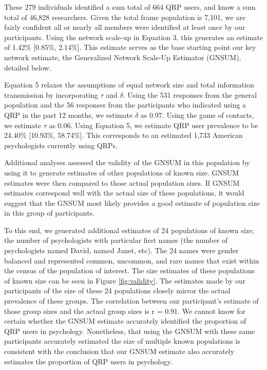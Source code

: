 \documentclass[jou]{apa6}
\theoremstyle{definition}
\theoremstyle{definition}
\theoremstyle{definition}
\theoremstyle{remark}
\begin{document}
These 279 individuals identified a sum total of 664 QRP users, and know
a sum total of 46,828 researchers. Given the total frame population is
7,101, we are fairly confident all or nearly all members were identified
at least once by our participants. Using the network scale-up in
Equation 3, this generates an estimate of 1.42\% {[}0.85\%, 2.14\%{]}.
This estimate serves as the base starting point our key network
estimate, the Generalized Network Scale-Up Estimator (GNSUM), detailed
below.

Equation 5 relaxes the assumptions of equal network size and total
information transmission by incorporating \(\tau\) and \(\delta\). Using
the 531 responses from the general population and the 56 responses from
the participants who indicated using a QRP in the past 12 months, we
estimate \(\delta\) as 0.97. Using the game of contacts, we estimate
\(\tau\) as 0.06. Using Equation 5, we estimate QRP user prevalence to
be 24.40\% {[}10.93\%, 58.74\%{]}. This corresponds to an estimated
1,733 American psychologists currently using QRPs.

Additional analyses assessed the validity of the GNSUM in this
population by using it to generate estimates of other populations of
known size. GNSUM estimates were then compared to those actual
population sizes. If GNSUM estimates correspond well with the actual
size of these populations, it would suggest that the GNSUM most likely
provides a good estimate of population size in this group of
participants.

To this end, we generated additional estimates of 24 populations of
known size; the number of psychologists with particular first names (the
number of psychologists named David, named Janet, etc). The 24 names
were gender balanced and represented common, uncommon, and rare names
that exist within the census of the population of interest. The size
estimates of these populations of known size can be seen in Figure
\ref{fig:validity}. The estimates made by our participants of the size
of these 24 populations closely mirror the actual prevalence of these
groups. The correlation between our participant's estimate of those
group sizes and the actual group sizes is r = 0.91. We cannot know for
certain whether the GNSUM estimate accurately identified the proportion
of QRP users in psychology. Nonetheless, that using the GNSUM with these
same participants accurately estimated the size of multiple known
populations is consistent with the conclusion that our GNSUM estimate
also accurately estimates the proportion of QRP users in psychology.
\end{document}
